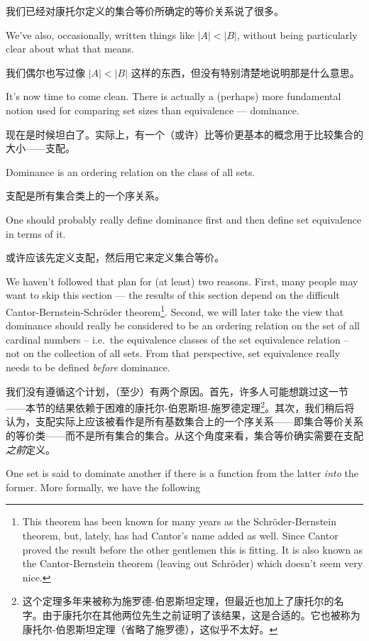 我们已经对康托尔定义的集合等价所确定的等价关系说了很多。

We've also, occasionally, written things like
$|A| < |B|$, without being particularly clear about what that means.

我们偶尔也写过像 $|A| < |B|$ 这样的东西，但没有特别清楚地说明那是什么意思。

It's now time to come clean.  There is actually a (perhaps) more fundamental
notion used for comparing set sizes than equivalence --- dominance.

现在是时候坦白了。实际上，有一个（或许）比等价更基本的概念用于比较集合的大小——支配。

Dominance is an ordering relation on the class of all sets.

支配是所有集合类上的一个序关系。

One should probably really define dominance first and then
define set equivalence in terms of it.

或许应该先定义支配，然后用它来定义集合等价。

We haven't followed that plan
for (at least) two reasons.   First, many people may want to skip this
section --- the results of this section depend on the difficult
Cantor-Bernstein-Schr\"{o}der theorem\footnote{This theorem has been %
known for many years as the Schr\"{o}der-Bernstein theorem, but, %
lately, has had Cantor's name added as well.
Since Cantor proved %
the result before the other gentlemen this is fitting.
It is also %
known as the Cantor-Bernstein theorem (leaving out Schr\"{o}der) %
which doesn't seem very nice.}.  Second, we will later take the view that dominance
should really be considered to be an ordering relation on the set of
all cardinal numbers -- i.e.\ the equivalence classes of the set equivalence
relation -- not on the collection of all sets.  From that perspective,
set equivalence really needs to be defined \emph{before} dominance.

我们没有遵循这个计划，（至少）有两个原因。首先，许多人可能想跳过这一节——本节的结果依赖于困难的康托尔-伯恩斯坦-施罗德定理\footnote{这个定理多年来被称为施罗德-伯恩斯坦定理，但最近也加上了康托尔的名字。由于康托尔在其他两位先生之前证明了该结果，这是合适的。它也被称为康托尔-伯恩斯坦定理（省略了施罗德），这似乎不太好。}。其次，我们稍后将认为，支配实际上应该被看作是所有基数集合上的一个序关系——即集合等价关系的等价类——而不是所有集合的集合。从这个角度来看，集合等价确实需要在支配\emph{之前}定义。

One set is said to dominate another if there is a function from the latter
\emph{into} the former.
More formally, we have the following

